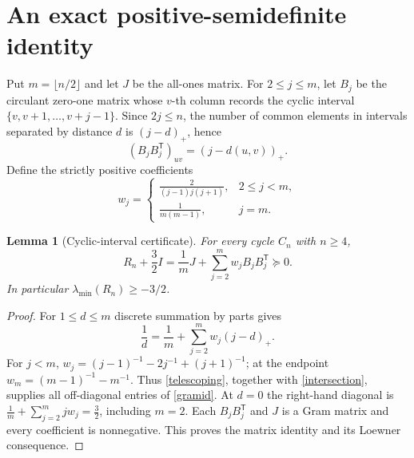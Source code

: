 \documentclass[10pt,twocolumn]{article}
\newtheorem{lemma}{Lemma}
\newcommand{\lammin}{\lambda_{\min}}
\begin{document}
\section{An exact positive-semidefinite identity}
Put $m=\lfloor n/2\rfloor$ and let $J$ be the all-ones matrix. For $2\le j\le m$, let $B_j$ be the circulant zero-one matrix whose $v$-th column records the cyclic interval $\{v,v+1,\ldots,v+j-1\}$. Since $2j\le n$, the number of common elements in intervals separated by distance $d$ is $(j-d)_+$, hence
\begin{equation}\label{intersection}
(B_jB_j^{\mathsf T})_{uv}=(j-d(u,v))_+.
\end{equation}
Define the strictly positive coefficients
\begin{equation}\label{weights}
w_j=\begin{cases}\displaystyle\frac{2}{(j-1)j(j+1)},&2\le j<m,\\[2pt]\displaystyle\frac1{m(m-1)},&j=m.
\end{cases}
\end{equation}
\begin{lemma}[Cyclic-interval certificate]\label{gram}
For every cycle $C_n$ with $n\ge4$,
\begin{equation}\label{gramid}
R_n+\frac32 I=\frac1mJ+\sum_{j=2}^{m}w_jB_jB_j^{\mathsf T}\succeq0.
\end{equation}
In particular $\lammin(R_n)\ge-3/2$.
\end{lemma}
\begin{proof}
For $1\le d\le m$ discrete summation by parts gives
\begin{equation}\label{telescoping}
\frac1d=\frac1m+\sum_{j=2}^{m}w_j(j-d)_+.
\end{equation}
For $j<m$, $w_j=(j-1)^{-1}-2j^{-1}+(j+1)^{-1}$; at the endpoint $w_m=(m-1)^{-1}-m^{-1}$. Thus \eqref{telescoping}, together with \eqref{intersection}, supplies all off-diagonal entries of \eqref{gramid}. At $d=0$ the right-hand diagonal is
$\frac1m+\sum_{j=2}^{m}jw_j=\frac32$,
including $m=2$. Each $B_jB_j^{\mathsf T}$ and $J$ is a Gram matrix and every coefficient is nonnegative. This proves the matrix identity and its Loewner consequence.
\end{proof}
\end{document}
